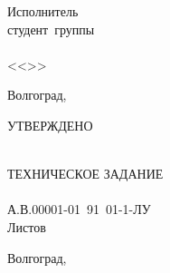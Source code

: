 {{\begin{flushleft}
\hfill
\begin{minipage}[c]{15em}
Исполнитель\\
студент\ группы\ \VSTUStudentGroup\\
\makebox[2cm]{\hrulefill}\VSTUStudentName\\
<<\makebox[1.5cm]{\hrulefill}>>\makebox[3.5cm]{\hrulefill}\the\year
\end{minipage}
\end{flushleft}
\vfill
\begin{center}
Волгоград,\ \the\year
\end{center}
\newpage
\clearpage
\thispagestyle{empty}
УТВЕРЖДЕНО\\
\vfill
\begin{center}
\VSTUTitle\\
\vspace{8mm}
ТЕХНИЧЕСКОЕ ЗАДАНИЕ\\
\VSTUDocumentCode{}\\
А.В.00001-01\ 91\ 01-1-ЛУ\\
Листов \totalpages\\
\end{center}
\vfill
\begin{center}
Волгоград,\ \the\year
\end{center}
\newpage
}
}
